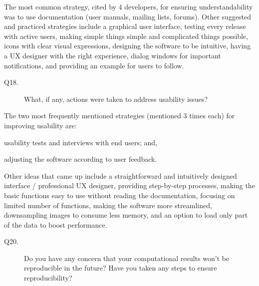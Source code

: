 \documentclass[final, 3p, times, authoryear]{elsarticle}
\begin{document}
The most common strategy, cited by 4 developers, for ensuring understandability
was to use documentation (user manuals, mailing lists, forums).  Other suggested
and practiced strategies include a graphical user interface, testing every
release with active users, making simple things simple and complicated things
possible, icons with clear visual expressions, designing the software to be
intuitive, having a UX designer with the right experience, dialog windows for
important notifications, and providing an example for users to follow.

\begin{description}
\item[Q18.] What, if any, actions were taken to address usability issues?
\end{description}

The two most frequently mentioned strategies (mentioned 3 times each) for
improving usability are:
\begin{inparaenum}[i)]
    \item usability tests and interviews with end users; and,
    \item adjusting the software according to user feedback.
\end{inparaenum}
Other ideas that came up include a straightforward and intuitively designed
interface / professional UX designer, providing step-by-step processes, making
the basic functions easy to use without reading the documentation, focusing on
limited number of functions, making the software more streamlined, downsampling
images to consume less memory, and an option to load only part of the data to
boost performance.

\begin{description}
\item[Q20.] Do you have any concern that your computational results won’t be
reproducible in the future? Have you taken any steps to ensure reproducibility?
\end{description}
\end{document}

